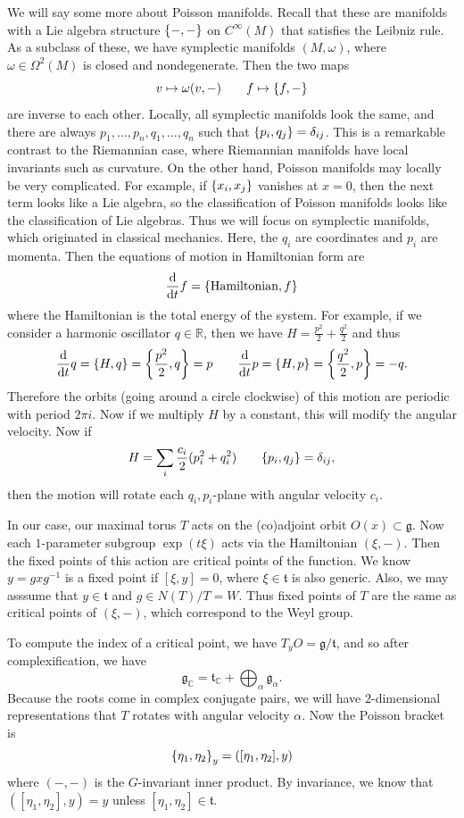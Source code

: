 \documentclass[leqno, openany]{memoir}
\theoremstyle{definition}
\theoremstyle{remark}
\theoremstyle{plain}
\theoremstyle{definition}
\theoremstyle{remark}
\newcommand{\R}{\mathbb{R}}
\newcommand{\C}{\mathbb{C}}
\newcommand{\mf}[1]{\mathfrak{#1}}
\begin{document}
We will say some more about Poisson manifolds. Recall that these are manifolds with a Lie algebra structure $\qty{-,-}$ on $C^{\infty}(M)$ that satisfies the Leibniz rule. As a subclass of these, we have symplectic manifolds $(M, \omega)$, where $\omega \in \Omega^2 (M)$ is closed and nondegenerate. Then the two maps 
\[ v \mapsto \omega(v, -) \qquad f \mapsto \qty{f, -}\] 
are inverse to each other. Locally, all symplectic manifolds look the same, and there are always $p_1, \ldots, p_n, q_1, \ldots, q_n$ such that $\qty{p_i, q_j} = \delta_{ij}$. This is a remarkable contrast to the Riemannian case, where Riemannian manifolds have local invariants such as curvature. On the other hand, Poisson manifolds may locally be very complicated. For example, if $\qty{x_i, x_j}$ vanishes at $x = 0$, then the next term looks like a Lie algebra, so the classification of Poisson manifolds looks like the classification of Lie algebras. Thus we will focus on symplectic manifolds, which originated in classical mechanics. Here, the $q_i$ are coordinates and $p_i$ are momenta. Then the equations of motion in Hamiltonian form are
\[ \dv{t} f = \qty{\text{Hamiltonian}, f} \]
where the Hamiltonian is the total energy of the system. For example, if we consider a harmonic oscillator $q \in \R$, then we have $H = \frac{p^2}{2} + \frac{q^2}{2}$ and thus
\[ \dv{t} q = \qty{H, q} = \qty{\frac{p^2}{2}, q} = p \qquad \dv{t} p = \qty{H, p} = \qty{\frac{q^2}{2}, p} = -q. \]
Therefore the orbits (going around a circle clockwise) of this motion are periodic with period $2 \pi i$. Now if we multiply $H$ by a constant, this will modify the angular velocity. Now if
\[ H = \sum_i \frac{c_i}{2} (p_i^2 + q_i^2) \qquad \qty{p_i, q_j} = \delta_{ij}, \]
then the motion will rotate each $q_i,p_i$-plane with angular velocity $c_i$.

In our case, our maximal torus $T$ acts on the (co)adjoint orbit $O(x) \subset \mf{g}$. Now each $1$-parameter subgroup $\exp(t \xi)$ acts via the Hamiltonian $(\xi, -)$. Then the fixed points of this action are critical points of the function. We know $y = g x g^{-1}$ is a fixed point if $[\xi, y] = 0$, where $\xi \in \mf{t}$ is also generic. Also, we may asssume that $y \in \mf{t}$ and $g \in N(T)/T = W$. Thus fixed points of $T$ are the same as critical points of $(\xi, -)$, which correspond to the Weyl group.

To compute the index of a critical point, we have $T_y O = \mf{g} / \mf{t}$, and so after complexification, we have 
\[ \mf{g}_{\C} = \mf{t}_{\C} + \bigoplus_{\alpha} \mf{g}_{\alpha}. \] 
Because the roots come in complex conjugate pairs, we will have $2$-dimensional representations that $T$ rotates with angular velocity $\alpha$. Now the Poisson bracket is
\[ \qty{\eta_1, \eta_2}_y = ([\eta_1, \eta_2], y) \]
where $(-,-)$ is the $G$-invariant inner product. By invariance, we know that $([\eta_1, \eta_2], y) = y$ unless $[\eta_1, \eta_2] \in \mf{t}$.
\end{document}
